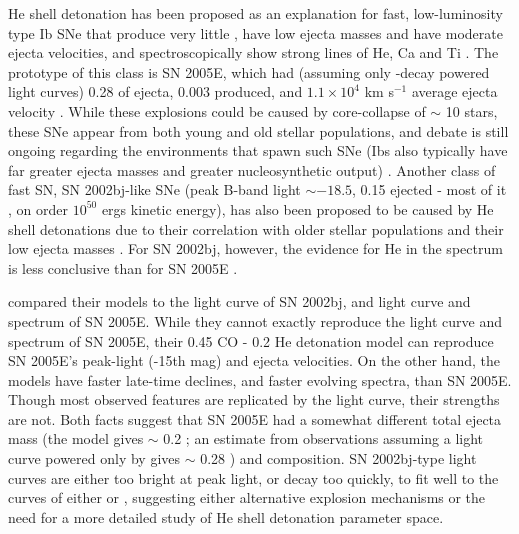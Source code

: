 He shell detonation has been proposed as an explanation for fast, low-luminosity type Ib SNe that produce very little {\Ni}, have low ejecta masses and have moderate ejecta velocities, and spectroscopically show strong lines of He, Ca and Ti \citep{pere+10a,wald+10}.  The prototype of this class is SN 2005E, which had (assuming only {\Ni}-decay powered light curves) 0.28 {\Msun} of ejecta, 0.003 {\Ni} produced, and $1.1 \times 10^{4}$ km s$^{-1}$ average ejecta velocity \citep{pere+10a}.  While these explosions could be caused by core-collapse of $\sim$ 10 {\Msun} stars, these SNe appear from both young and old stellar populations, and debate is still ongoing regarding the environments that spawn such SNe (Ibs also typically have far greater ejecta masses and greater nucleosynthetic output) \citep{kawa+10,pere+10a,wald+10,pere+11}.  Another class of fast SN, SN 2002bj-like SNe (peak B-band light $\sim -18.5$, 0.15 {\Msun} ejected - most of it {\Ni}, on order $10^{50}$ ergs kinetic energy), has also been proposed to be caused by He shell detonations due to their correlation with older stellar populations and their low ejecta masses \citep{pere+10b}. For SN 2002bj, however, the evidence for He in the spectrum is less conclusive than for SN 2005E \citep{pere+10b, pozn+10}.

\citeauthor{wald+10} compared their models to the light curve of SN 2002bj, and light curve and spectrum of SN 2005E.  While they cannot exactly reproduce the light curve and spectrum of SN 2005E, their 0.45 CO - 0.2 He detonation model can reproduce SN 2005E's peak-light (-15th mag) and ejecta velocities.  On the other hand, the models have faster late-time declines, and faster evolving spectra, than SN 2005E. Though most observed features are replicated by the light curve, their strengths are not.  Both facts suggest that SN 2005E had a somewhat different total ejecta mass (the model gives $\sim$ 0.2 {\Msun}; an estimate from observations assuming a light curve powered only by {\Ni} gives $\sim$ 0.28 {\Msun}) and composition.  SN 2002bj-type light curves are either too bright at peak light, or decay too quickly, to fit well to the curves of either \citeauthor{wald+10} or \cite{sim+10}, suggesting either alternative explosion mechanisms or the need for a more detailed study of He shell detonation parameter space.

